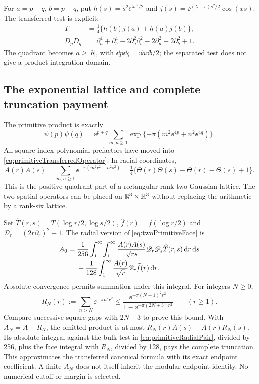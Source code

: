For $a=p+q$, $b=p-q$, put $h(s)=s^2\ee^{\lambda s^2/2}$ and
$j(s)=\ee^{(\lambda-v)s^2/2}\cos(xs)$. The transferred test is explicit:
\begin{align}
 T&=\tfrac14\{h(b)j(a)+h(a)j(b)\},\label{eq:primitiveSeparatedTest}\\
 D_pD_q&=\partial_a^4+\partial_b^4-2\partial_a^2\partial_b^2
          -2\partial_a^2-2\partial_b^2+1.
 \label{eq:primitiveTransferredOperator}
\end{align}
The quadrant becomes $a\ge|b|$, with $\dd p\dd q=\dd a\dd b/2$;
the separated test does not give a product integration domain.

\subsection{The exponential lattice and complete truncation payment}
The primitive product is exactly
\begin{equation}\label{eq:primitiveLattice}
 \psi(p)\psi(q)=\ee^{p+q}\sum_{m,n\ge1}
      \exp\{-\pi(m^2\ee^{4p}+n^2\ee^{4q})\}.
\end{equation}
All square-index polynomial prefactors have moved into
\eqref{eq:primitiveTransferredOperator}. In radial coordinates,
\begin{equation}\label{eq:primitiveThetaProduct}
 A(r)A(s)=\sum_{m,n\ge1}\ee^{-\pi(m^2r^2+n^2s^2)}
 =\tfrac14\{\Theta(r)\Theta(s)-\Theta(r)-\Theta(s)+1\}.
\end{equation}
This is the positive-quadrant part of a rectangular rank-two Gaussian
lattice. The two spatial operators can be placed on $\mathbb R^3\times\mathbb R^3$
without replacing the arithmetic by a rank-six lattice.

Set $\widehat T(r,s)=T(\log r/2,\log s/2)$,
$\widehat f(r)=f(\log r/2)$ and $\mathscr D_r=(2r\partial_r)^2-1$.
The radial version of \eqref{eq:twoPrimitiveFace} is
\begin{align}
 A_0={}&\frac1{256}\int_1^\infty\!\int_1^\infty
 \frac{A(r)A(s)}{\sqrt{rs}}\mathscr D_r\mathscr D_s\widehat T(r,s)
       \,\mathrm d r\,\mathrm d s\notag\\
 &+\frac1{128}\int_1^\infty\frac{A(r)}{\sqrt r}
                  \mathscr D_r\widehat f(r)\,\mathrm d r.
 \label{eq:primitiveRadialPair}
\end{align}
Absolute convergence permits summation under this integral. For integers $N\ge0$,
\begin{equation}\label{eq:primitiveTail}
 R_N(r):=\sum_{n>N}\ee^{-\pi n^2r^2}
 \le\frac{\ee^{-\pi(N+1)^2r^2}}
           {1-\ee^{-\pi(2N+3)r^2}}\qquad(r\ge1).
\end{equation}
Compare successive square gaps with $2N+3$ to prove this bound. With
$A_N=A-R_N$, the omitted product is at most
$R_N(r)A(s)+A(r)R_N(s)$. Its absolute integral against the bulk test in
\eqref{eq:primitiveRadialPair}, divided by 256, plus the face integral
with $R_N$, divided by 128, pays the complete truncation. This approximates
the transferred canonical formula with its exact endpoint coefficient.
A finite $A_N$ does not itself inherit the modular endpoint identity.
No numerical cutoff or margin is selected.

